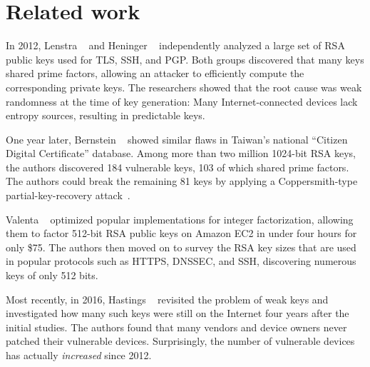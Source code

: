 \section{Related work}
\label{sec:related}
In 2012, Lenstra \ea~\cite{Lenstra2012a} and Heninger \ea~\cite{Heninger2012a}
independently analyzed a large set of RSA public keys used for TLS, SSH, and
PGP.  Both groups discovered that many keys shared prime factors, allowing an
attacker to efficiently compute the corresponding private keys.  The researchers
showed that the root cause was weak randomness at the time of key generation: 
Many Internet-connected devices lack entropy sources, resulting in predictable
keys.

One year later, Bernstein \ea~\cite{Bernstein2013a} showed similar flaws in
Taiwan's national ``Citizen Digital Certificate'' database.  Among more than two
million 1024-bit RSA keys, the authors discovered 184 vulnerable keys, 103 of
which shared prime factors.  The authors could break the remaining 81 keys by
applying a Coppersmith-type partial-key-recovery
attack~\cite{Coppersmith1996a,Coppersmith1997a}.

Valenta \ea~\cite{Valenta2016a} optimized popular implementations for integer
factorization, allowing them to factor 512-bit RSA public keys on Amazon EC2 in
under four hours for only \$75.  The authors then moved on to survey the RSA key
sizes that are used in popular protocols such as HTTPS, DNSSEC, and SSH,
discovering numerous keys of only 512 bits.

Most recently, in 2016, Hastings \ea~\cite{Hastings2016a} revisited the problem
of weak keys and investigated how many such keys were still on the Internet
four years after the initial studies.  The authors found that many vendors and
device owners never patched their vulnerable devices.  Surprisingly, the number
of vulnerable devices has actually \emph{increased} since 2012.
